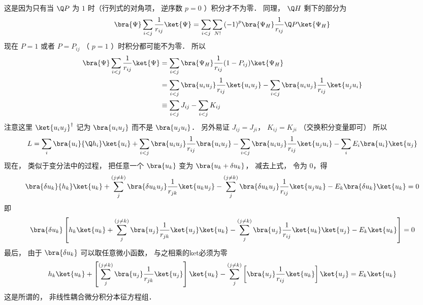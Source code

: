 这是因为只有当 $\Q P$ 为 $1$ 时（行列式的对角项， 逆序数 $p = 0$ ）积分才不为零． 同理， $\Q H$ 剩下的部分为
\begin{equation}
\bra{\Psi}\sum\limits_{i < j} {\frac{1}{{{r_{ij}}}}} \ket{\Psi}  = \sum\limits_{i < j} {\sum\limits_{N!} {{{( - 1)}^p}\bra{\Psi _H}\frac{1}{{{r_{ij}}}}\Q P \ket{{\Psi _H}} } } 
\end{equation}
现在 $P = 1$ 或者 $P = {P_{ij}}$ （ $p=1$ ）时积分都可能不为零． 所以
 \begin{equation}
\begin{aligned}
  \bra{\Psi}\sum\limits_{i < j} {\frac{1}{{{r_{ij}}}}} \ket{\Psi} & = \sum\limits_{i < j} {\bra{\Psi _H}\frac{1}{{{r_{ij}}}}(1 - {P_{ij}}) \ket{{\Psi _H}} }  \\
  &= \sum\limits_{i < j} {\bra{{u_i}{u_j}}\frac{1}{{{r_{ij}}}} \ket{{u_i}{u_j}}}  - \sum\limits_{i < j} {\bra{{u_i}{u_j}}\frac{1}{{{r_{ij}}}} \ket{{u_j}{u_i}} } \\
  & \equiv \sum\limits_{i < j} {{J_{ij}}}  - \sum\limits_{i < j} {{K_{ij}}} \\ 
\end{aligned}
\end{equation}
注意这里 ${ \ket{{u_i}{u_j}} ^\dag }$ 记为 $\bra{{u_i}{u_j}}$ 而不是 $\bra{{u_j}{u_i}}$．  另外易证 ${J_{ij}} = {J_{ji}}$，  ${K_{ij}} = {K_{ji}}$ （交换积分变量即可） 所以
 \begin{equation}
L = \sum\limits_i {\bra{{u_i}}{\Q h_i} \ket{{u_i}} }  + \sum\limits_{i < j} {\bra{{u_i}{u_j}}\frac{1}{{{r_{ij}}}} \bra{{u_i}{u_j}} }  - \sum\limits_{i < j} {\bra{{u_i}{u_j}} \frac{1}{{{r_{ij}}}} \ket{{u_j}{u_i}}  }  - \sum\limits_i {E_i}\bra{u_i}\ket{u_j}
\end{equation}
现在， 类似于变分法中的过程， 把任意一个 $\bra{u_k}$ 变为 $\bra{{u_k} + \delta {u_k}}$，  减去上式， 令为 $0$，得
 \begin{equation}
\bra{\delta {u_k}}{h_k} \ket{{u_k}}  + \sum\limits_j^{(j \ne k)} {\bra{\delta {u_k}{u_j}}\frac{1}{{{r_{jk}}}} \ket{{u_k}{u_j}} }  - \sum\limits_j^{(j \ne k)} {\bra{\delta {u_k}{u_j}}\frac{1}{{{r_{ij}}}}\ket{{u_j}{u_k}} }  - {E_k}\bra{\delta u_k}\ket{u_k}  = 0
\end{equation}
即
 \begin{equation}
\bra{\delta {u_k}}\left[ {{h_k} \ket{{u_k}}  + \sum\limits_j^{(j \ne k)} {\bra{{u_j}} \frac{1}{{{r_{jk}}}} \ket{{u_j}} \ket{{u_k}} }  - \sum\limits_j^{(j \ne k)} {\bra{{u_j}}\frac{1}{{{r_{ij}}}} \ket{{u_k}} \ket{{u_j}} }  - {E_k} \ket{{u_k}} } \right] = 0
\end{equation}
最后， 由于 $\bra{\delta {u_k}}$ 可以取任意微小函数， 与之相乘的ket必须为零
 \begin{equation}
{h_k} \ket{{u_k}}  + \left[ {\sum\limits_j^{(j \ne k)} {\bra{{u_j}}\frac{1}{{{r_{jk}}}} \ket{{u_j}}} } \right] \ket{{u_k}}  - \sum\limits_j^{(j \ne k)} {\left[ {\bra{{u_j}}\frac{1}{{{r_{ij}}}}  \ket{{u_k}}} \right] \ket{{u_j}} }  = {E_k} \ket{{u_k}} 
\end{equation}
这是所谓的， 非线性耦合微分积分本征方程组．


